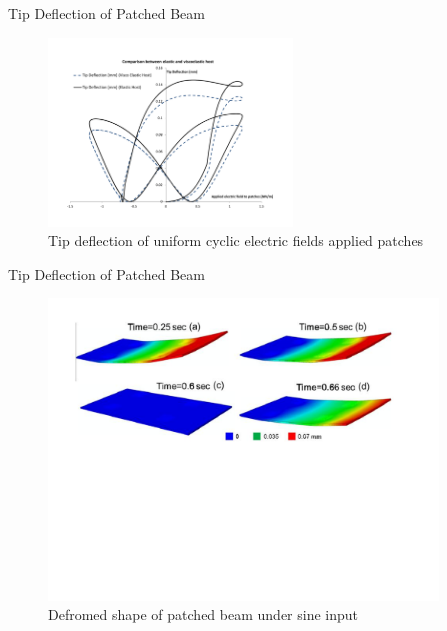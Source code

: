 \documentclass{beamer}
\begin{document}
\begin{frame}{Tip Deflection of Patched Beam} 
\begin{figure}
\includegraphics[height=5cm]{../images/ViscoHostCompositeActiveBeam}
\caption{Tip deflection of uniform cyclic electric fields applied patches}
\end{figure}
\end{frame}

\begin{frame}{Tip Deflection of Patched Beam}
\begin{figure}
\includegraphics[height=8cm]{../images/active_patched_beam_deflection_contour.pdf}
\caption{Defromed shape of patched beam under sine input}
\end{figure}
\end{frame}
\end{document}
